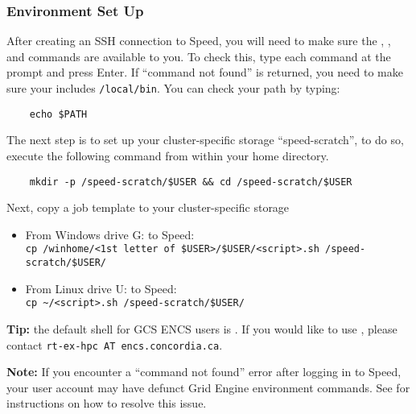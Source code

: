 \subsubsection{Environment Set Up}
\label{sect:envsetup}
%
%

After creating an SSH connection to Speed, you will need to make sure the , , and 
commands are available to you. To check this, type each command at the prompt and press Enter.
If ``command not found'' is returned, you need to make sure your  includes \texttt{/local/bin}.
You can check your path by typing:
\begin{verbatim}
    echo $PATH
\end{verbatim}

\noindent The next step is to set up your cluster-specific storage ``speed-scratch'', to do so, execute the following command from within your
home directory.
\begin{verbatim}
    mkdir -p /speed-scratch/$USER && cd /speed-scratch/$USER
\end{verbatim}

\noindent Next, copy a job template to your cluster-specific storage
\begin{itemize}
    \item From Windows drive G: to Speed:\\
    \verb|cp /winhome/<1st letter of $USER>/$USER/<script>.sh /speed-scratch/$USER/|
    \item From Linux drive U: to Speed:\\
    \verb|cp ~/<script>.sh /speed-scratch/$USER/|
\end{itemize}

\noindent \textbf{Tip:} the default shell for GCS ENCS users is .
If you would like to use , please contact \texttt{rt-ex-hpc AT encs.concordia.ca}.

\noindent \textbf{Note:} If you encounter a ``command not found'' error after logging in to Speed,
your user account may have defunct Grid Engine environment commands.
See  for instructions on how to resolve this issue.